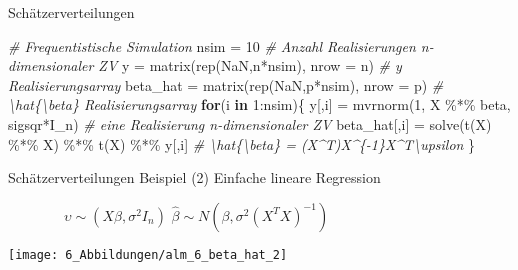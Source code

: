 \documentclass[
  8pt,
  ignorenonframetext,
]{beamer}
\newenvironment{Shaded}{\begin{snugshade}}{\end{snugshade}}
\newcommand{\AttributeTok}[1]{\textcolor[rgb]{0.77,0.63,0.00}{#1}}
\newcommand{\CommentTok}[1]{\textcolor[rgb]{0.56,0.35,0.01}{\textit{#1}}}
\newcommand{\ConstantTok}[1]{\textcolor[rgb]{0.00,0.00,0.00}{#1}}
\newcommand{\ControlFlowTok}[1]{\textcolor[rgb]{0.13,0.29,0.53}{\textbf{#1}}}
\newcommand{\DecValTok}[1]{\textcolor[rgb]{0.00,0.00,0.81}{#1}}
\newcommand{\FunctionTok}[1]{\textcolor[rgb]{0.00,0.00,0.00}{#1}}
\newcommand{\NormalTok}[1]{#1}
\newcommand{\OtherTok}[1]{\textcolor[rgb]{0.56,0.35,0.01}{#1}}
\newcommand{\SpecialCharTok}[1]{\textcolor[rgb]{0.00,0.00,0.00}{#1}}
\begin{document}
\begin{frame}[fragile]{Schätzerverteilungen}
\begin{Shaded}
\begin{Highlighting}[]
\CommentTok{\# Frequentistische Simulation}
\NormalTok{nsim     }\OtherTok{=} \DecValTok{10}                                         \CommentTok{\# Anzahl Realisierungen n{-}dimensionaler ZV}
\NormalTok{y        }\OtherTok{=} \FunctionTok{matrix}\NormalTok{(}\FunctionTok{rep}\NormalTok{(}\ConstantTok{NaN}\NormalTok{,n}\SpecialCharTok{*}\NormalTok{nsim), }\AttributeTok{nrow =}\NormalTok{ n)          }\CommentTok{\# y Realisierungsarray}
\NormalTok{beta\_hat }\OtherTok{=} \FunctionTok{matrix}\NormalTok{(}\FunctionTok{rep}\NormalTok{(}\ConstantTok{NaN}\NormalTok{,p}\SpecialCharTok{*}\NormalTok{nsim), }\AttributeTok{nrow =}\NormalTok{ p)          }\CommentTok{\# \textbackslash{}hat\{\textbackslash{}beta\} Realisierungsarray}
\ControlFlowTok{for}\NormalTok{(i }\ControlFlowTok{in} \DecValTok{1}\SpecialCharTok{:}\NormalTok{nsim)\{}
\NormalTok{  y[,i]        }\OtherTok{=} \FunctionTok{mvrnorm}\NormalTok{(}\DecValTok{1}\NormalTok{, X }\SpecialCharTok{\%*\%}\NormalTok{ beta, sigsqr}\SpecialCharTok{*}\NormalTok{I\_n)   }\CommentTok{\# eine Realisierung n{-}dimensionaler ZV}
\NormalTok{  beta\_hat[,i] }\OtherTok{=} \FunctionTok{solve}\NormalTok{(}\FunctionTok{t}\NormalTok{(X) }\SpecialCharTok{\%*\%}\NormalTok{ X) }\SpecialCharTok{\%*\%} \FunctionTok{t}\NormalTok{(X) }\SpecialCharTok{\%*\%}\NormalTok{ y[,i] }\CommentTok{\# \textbackslash{}hat\{\textbackslash{}beta\} = (X\^{}T)X\^{}\{{-}1\}X\^{}T\textbackslash{}upsilon}
\NormalTok{\}}
\end{Highlighting}
\end{Shaded}
\end{frame}

\begin{frame}{Schätzerverteilungen}
\protect\hypertarget{schuxe4tzerverteilungen-3}{}
Beispiel (2) Einfache lineare Regression

\vspace{4mm}
\center

\(\quad\quad\quad\quad \upsilon \sim (X\beta,\sigma^2I_n)\) \hspace{3cm}
\(\hat{\beta} \sim N(\beta,\sigma^2(X^TX)^{-1})\)

\begin{center}\texttt{[image: 6\_Abbildungen/alm\_6\_beta\_hat\_2]} \end{center}
\end{frame}
\end{document}
